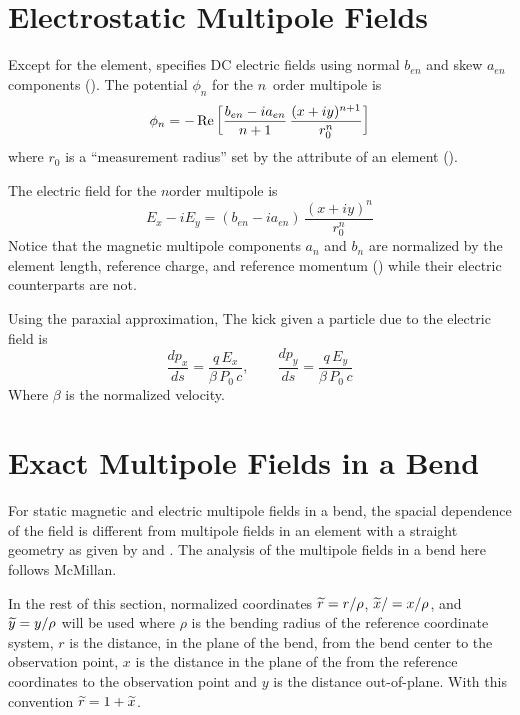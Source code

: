 \section{Electrostatic Multipole Fields}
\label{s:elec.field}

Except for the  element, \bmad specifies DC electric fields using normal
$b_{en}$ and skew $a_{en}$ components (). The potential $\phi_n$ for the
$n$\Th\ order multipole is
\begin{equation}
  \phi_n = -\operatorname{Re} \left[ \frac{b_{en} - i a_{en}}{n + 1} \, \frac{(x + i y)^{n+1}}{r_0^n} \right]
  \label{pbian1}
\end{equation}
where $r_0$ is a ``measurement radius'' set by the  attribute of an element
().

The electric field for the $n$\Th order multipole is
\begin{equation}
  E_x - i E_y = (b_{en} - i a_{en}) \, \frac{(x + i y)^n}{r_0^n}
  \label{exiey}
\end{equation}
Notice that the magnetic multipole components $a_n$ and $b_n$ are normalized by the
element length, reference charge, and reference momentum () while their electric
counterparts are not.

Using the paraxial approximation, The kick given a particle due to the electric field is
\begin{equation}
  \frac{dp_x}{ds} = \frac{q \, E_x}{\beta \, P_0 \, c}, \qquad \frac{dp_y}{ds} = \frac{q \, E_y}{\beta \, P_0 \, c}
\end{equation}
Where $\beta$ is the normalized velocity.

\section{Exact Multipole Fields in a Bend}
\label{s:field.exact}

For static magnetic and electric multipole fields in a bend, the spacial dependence of the
field is different from multipole fields in an element with a straight geometry as given
by  and . The analysis of the multipole fields in a bend here follows
McMillan\cite{b:mcmillan}.  

In the rest of this section, normalized coordinates ${\widetilde r} = r / \rho$, ${\widetilde x} / = x /
\rho$, and ${\widetilde y} = y / \rho$ will be used where $\rho$ is the bending radius of the
reference coordinate system, $r$ is the distance, in the plane of the bend, from the bend
center to the observation point, $x$ is the distance in the plane of the from the reference
coordinates to the observation point and $y$ is the distance out-of-plane. With this
convention ${\widetilde r} = 1 + {\widetilde x}$.

